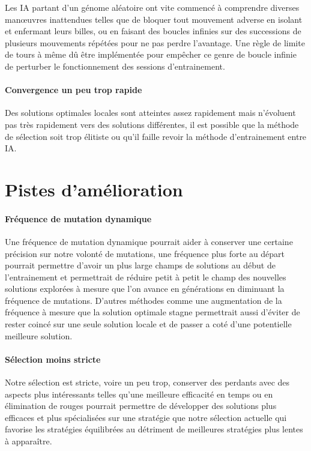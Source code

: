 \documentclass{scrreprt}
\begin{document}
			Les IA partant d'un génome aléatoire ont vite commencé à comprendre diverses manœuvres inattendues telles que de bloquer tout mouvement adverse en isolant et enfermant leurs billes, ou en faisant des boucles infinies sur des successions de plusieurs mouvements répétées pour ne pas perdre l'avantage. Une règle de limite de tours à même dû être implémentée pour empêcher ce genre de boucle infinie de perturber le fonctionnement des sessions d'entrainement.
	
			\paragraph{Convergence un peu trop rapide}
			
			Des solutions optimales locales sont atteintes assez rapidement mais n'évoluent pas très rapidement vers des solutions différentes, il est possible que la méthode de sélection soit trop élitiste ou qu'il faille revoir la méthode d'entrainement entre IA.
			
		\section{Pistes d'amélioration}
			\paragraph{Fréquence de mutation dynamique}
			
			Une fréquence de mutation dynamique pourrait aider à conserver une certaine précision sur notre volonté de mutations, une fréquence plus forte au départ pourrait permettre d'avoir un plus large champs de solutions au début de l'entrainement et permettrait de réduire petit à petit le champ des nouvelles solutions explorées à mesure que l'on avance en générations en diminuant la fréquence de mutations. D'autres méthodes comme une augmentation de la fréquence à mesure que la solution optimale stagne permettrait aussi d'éviter de rester coincé sur une seule solution locale et de passer a coté d'une potentielle meilleure solution.
			
			\paragraph{Sélection moins stricte}
			
			Notre sélection est stricte, voire un peu trop, conserver des perdants avec des aspects plus intéressants telles qu'une meilleure efficacité en temps ou en élimination de rouges pourrait permettre de développer des solutions plus efficaces et plus spécialisées sur une stratégie que notre sélection actuelle qui favorise les stratégies équilibrées au détriment de meilleures stratégies plus lentes à apparaître. 
			
\end{document}
